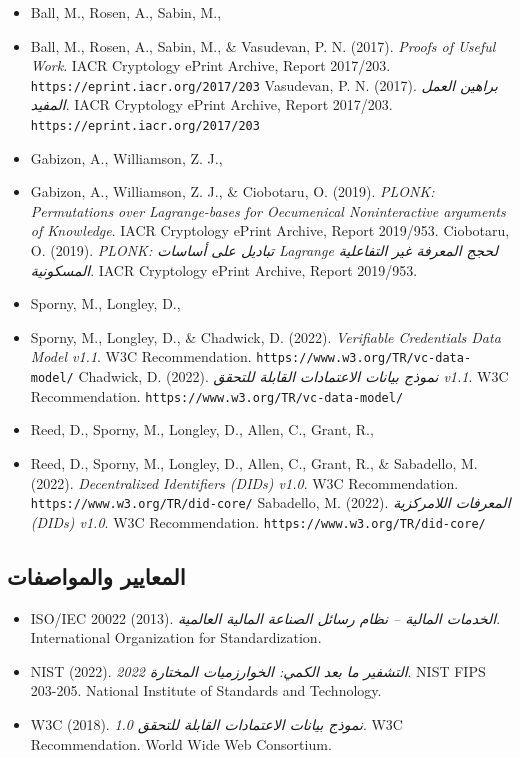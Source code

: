 \documentclass[11pt]{article}
\begin{document}
\begin{itemize}[leftmargin=*, label={}]
  \item Ball, M., Rosen, A., Sabin, M., \  \item Ball, M., Rosen, A., Sabin, M., \& Vasudevan, P. N. (2017). \textit{Proofs of Useful Work}. IACR Cryptology ePrint Archive, Report 2017/203. \texttt{https://eprint.iacr.org/2017/203} Vasudevan, P. N. (2017). \textit{براهين العمل المفيد}. IACR Cryptology ePrint Archive, Report 2017/203. \texttt{https://eprint.iacr.org/2017/203}

  \item Gabizon, A., Williamson, Z. J., \  \item Gabizon, A., Williamson, Z. J., \& Ciobotaru, O. (2019). \textit{PLONK: Permutations over Lagrange-bases for Oecumenical Noninteractive arguments of Knowledge}. IACR Cryptology ePrint Archive, Report 2019/953. Ciobotaru, O. (2019). \textit{PLONK: تباديل على أساسات Lagrange لحجج المعرفة غير التفاعلية المسكونية}. IACR Cryptology ePrint Archive, Report 2019/953.

  \item Sporny, M., Longley, D., \  \item Sporny, M., Longley, D., \& Chadwick, D. (2022). \textit{Verifiable Credentials Data Model v1.1}. W3C Recommendation. \texttt{https://www.w3.org/TR/vc-data-model/} Chadwick, D. (2022). \textit{نموذج بيانات الاعتمادات القابلة للتحقق v1.1}. W3C Recommendation. \texttt{https://www.w3.org/TR/vc-data-model/}

  \item Reed, D., Sporny, M., Longley, D., Allen, C., Grant, R., \  \item Reed, D., Sporny, M., Longley, D., Allen, C., Grant, R., \& Sabadello, M. (2022). \textit{Decentralized Identifiers (DIDs) v1.0}. W3C Recommendation. \texttt{https://www.w3.org/TR/did-core/} Sabadello, M. (2022). \textit{المعرفات اللامركزية (DIDs) v1.0}. W3C Recommendation. \texttt{https://www.w3.org/TR/did-core/}
\end{itemize}

\subsection*{المعايير والمواصفات}

\begin{itemize}[leftmargin=*, label={}]
  \item ISO/IEC 20022 (2013). \textit{الخدمات المالية -- نظام رسائل الصناعة المالية العالمية}. International Organization for Standardization.

  \item NIST (2022). \textit{التشفير ما بعد الكمي: الخوارزميات المختارة 2022}. NIST FIPS 203-205. National Institute of Standards and Technology.

  \item W3C (2018). \textit{نموذج بيانات الاعتمادات القابلة للتحقق 1.0}. W3C Recommendation. World Wide Web Consortium.
\end{itemize}
\end{document}
